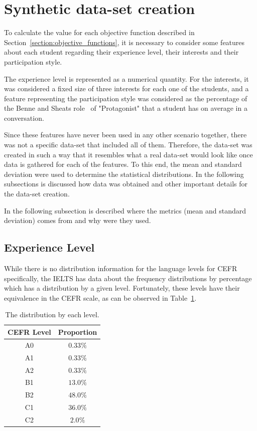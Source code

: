 \section{Synthetic data-set creation}
\label{section:synthetic_dataset}

To calculate the value for each objective function described in Section~\ref{section:objective_functions}, it is necessary to consider some features about each student regarding their experience level, their interests and their participation style.

The experience level is represented as a numerical quantity. For the interests, it was considered a fixed size of three interests for each one of the students, and a feature representing the participation style was considered as the percentage of the Benne and Sheats role~\cite{FunctionalRoles} of "Protagonist" that a student has on average in a conversation.

Since these features have never been used in any other scenario together, there was not a specific data-set that included all of them. Therefore, the data-set was created in such a way that it resembles what a real data-set would look like once data is gathered for each of the features. To this end, the mean and standard deviation were used to determine the statistical distributions. In the following subsections is discussed how data was obtained and other important details for the data-set creation.

In the following subsection is described where the metrics (mean and standard deviation) comes from and why were they used.

\subsection{Experience Level} 

While there is no distribution information for the language levels for CEFR specifically, the IELTS has data about the frequency distributions by percentage~\cite{ielts_demographic_data_2018} which has a distribution by a given level. Fortunately, these levels have their equivalence in the CEFR scale, as can be observed in Table~\ref{table:results_levels}.

\begin{table}[H]
    \centering
    \begin{tabular}{cc}
    \hline
    CEFR Level & Proportion \\
    \hline
    A0         & $0.33\%$     \\
    A1         & $0.33\%$     \\
    A2         & $0.33\%$     \\
    B1         & $13.0\%$     \\
    B2         & $48.0\%$     \\
    C1         & $36.0\%$     \\
    C2         & $2.0\%$      \\
    \hline
    \end{tabular}
    \caption{The distribution by each level.}
    \label{table:results_levels}
\end{table}

